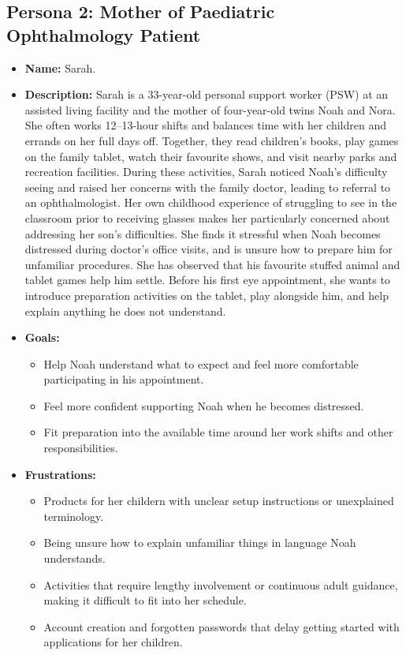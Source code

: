 \documentclass[12pt]{article}
\begin{document}
\subsection{Persona 2: Mother of Paediatric Ophthalmology Patient}
\begin{itemize}
\item \textbf{Name:} Sarah.

\item \textbf{Description:} Sarah is a 33-year-old personal support worker
(PSW) at an assisted living facility and the mother of four-year-old twins
Noah and Nora. She often works 12--13-hour shifts and balances time with her
children and errands on her full days off. Together, they read children's
books, play games on the family tablet, watch their favourite shows, and visit
nearby parks and recreation facilities. During these activities, Sarah
noticed Noah's difficulty seeing and raised her concerns with the family
doctor, leading to referral to an ophthalmologist. Her own childhood
experience of struggling to see in the classroom prior to receiving glasses
makes her particularly concerned about addressing her son's difficulties.
She finds it stressful when Noah becomes distressed during doctor's office visits,
and is unsure how to prepare him for unfamiliar procedures. She has observed
that his favourite stuffed animal and tablet games help him settle.
Before his first eye appointment, she wants to introduce preparation
activities on the tablet, play alongside him, and help
explain anything he does not understand.

\item \textbf{Goals:}
\begin{itemize}
    \item Help Noah understand what to expect and feel more comfortable
    participating in his appointment.
    \item Feel more confident supporting Noah when he becomes distressed.
    \item Fit preparation into the available time around her work shifts and other responsibilities.
\end{itemize}

\item \textbf{Frustrations:}
\begin{itemize}
    \item Products for her childern with unclear setup instructions or unexplained terminology.
    \item Being unsure how to explain unfamiliar things in language
    Noah understands.
    \item Activities that require lengthy involvement or continuous adult
    guidance, making it difficult to fit into her schedule.
    \item Account creation and forgotten passwords that delay getting started
    with applications for her children.
\end{itemize}


\end{itemize}
\end{document}
